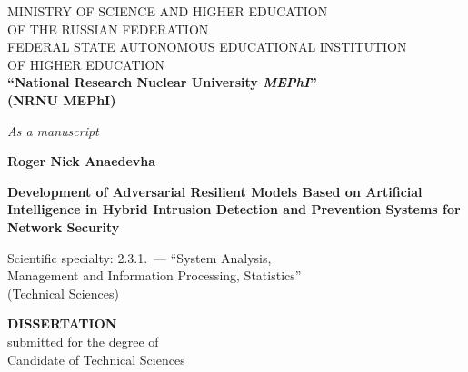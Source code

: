 
\begin{titlepage}
\thispagestyle{empty}
\begin{center}

{\small
MINISTRY OF SCIENCE AND HIGHER EDUCATION\\
OF THE RUSSIAN FEDERATION\\
FEDERAL STATE AUTONOMOUS EDUCATIONAL INSTITUTION\\
OF HIGHER EDUCATION\\[2pt]
\textbf{``National Research Nuclear University \textit{MEPhI}''}\\
\textbf{(NRNU MEPhI)}
}

\end{center}

\hfill
\begin{minipage}{0.45\textwidth}
\flushright
\itshape As a manuscript
\end{minipage}

\vspace{1.2cm}

\begin{center}

{\large\textbf{Roger Nick Anaedevha}}

\vspace{1.1cm}

{\large\textbf{Development of Adversarial Resilient Models
Based on Artificial Intelligence in Hybrid Intrusion
Detection and Prevention Systems for Network Security}}

\vspace{1.3cm}

{\small
Scientific specialty: 2.3.1.~--- ``System Analysis,\\
Management and Information Processing, Statistics''\\
(Technical Sciences)
}

\vspace{1.0cm}

\textbf{DISSERTATION}\\[2pt]
submitted for the degree of\\
Candidate of Technical Sciences


\end{center}
\end{titlepage}
